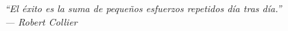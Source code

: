 \thispagestyle{empty}
\null\vfill
\begin{flushright}

{\large \textit{``El éxito es la suma de pequeños esfuerzos repetidos día tras día.''}}\\
\vspace{0.5cm}
{\large \textit{— Robert Collier}}

\end{flushright}
